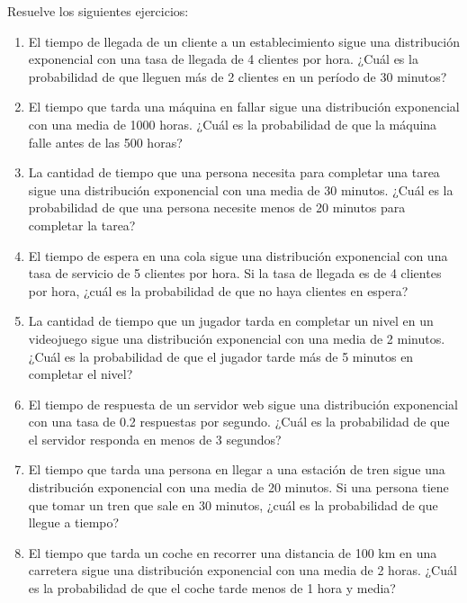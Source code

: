 \begin{Ejer}
Resuelve los siguientes ejercicios:
\begin{enumerate}

    \item El tiempo de llegada de un cliente a un establecimiento sigue una distribución exponencial con una tasa de llegada de 4 clientes por hora. ¿Cuál es la probabilidad de que lleguen más de 2 clientes en un período de 30 minutos?

    \item El tiempo que tarda una máquina en fallar sigue una distribución exponencial con una media de 1000 horas. ¿Cuál es la probabilidad de que la máquina falle antes de las 500 horas?

    \item La cantidad de tiempo que una persona necesita para completar una tarea sigue una distribución exponencial con una media de 30 minutos. ¿Cuál es la probabilidad de que una persona necesite menos de 20 minutos para completar la tarea?

    \item El tiempo de espera en una cola sigue una distribución exponencial con una tasa de servicio de 5 clientes por hora. Si la tasa de llegada es de 4 clientes por hora, ¿cuál es la probabilidad de que no haya clientes en espera?

    \item La cantidad de tiempo que un jugador tarda en completar un nivel en un videojuego sigue una distribución exponencial con una media de 2 minutos. ¿Cuál es la probabilidad de que el jugador tarde más de 5 minutos en completar el nivel?

    \item El tiempo de respuesta de un servidor web sigue una distribución exponencial con una tasa de 0.2 respuestas por segundo. ¿Cuál es la probabilidad de que el servidor responda en menos de 3 segundos?
    
        \item El tiempo que tarda una persona en llegar a una estación de tren sigue una distribución exponencial con una media de 20 minutos. Si una persona tiene que tomar un tren que sale en 30 minutos, ¿cuál es la probabilidad de que llegue a tiempo?

    \item El tiempo que tarda un coche en recorrer una distancia de 100 km en una carretera sigue una distribución exponencial con una media de 2 horas. ¿Cuál es la probabilidad de que el coche tarde menos de 1 hora y media?


\end{enumerate}
\end{Ejer}
